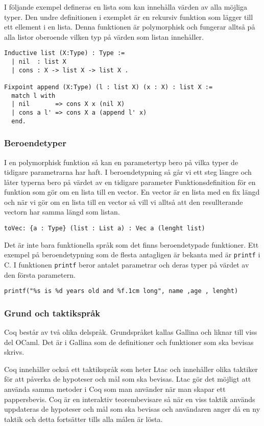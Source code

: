 I följande exempel defineras en lista som kan innehålla värden av alla möjliga
typer. Den undre definitionen i exemplet är en rekursiv funktion som lägger till
ett ellement i en lista. Denna funktionen är polymorphisk och fungerar alltså på
alla listor oberoende vilken typ på värden som listan innehåller.
\begin{verbatim}
Inductive list (X:Type) : Type :=
  | nil  : list X
  | cons : X -> list X -> list X .

Fixpoint append (X:Type) (l : list X) (x : X) : list X :=
  match l with
  | nil       => cons X x (nil X)
  | cons a l' => cons X a (append l' x)
  end.
\end{verbatim}

\subsubsection{Beroendetyper}
I en polymorphisk funktion så kan en parametertyp bero på vilka typer de
tidigare parametrarna har haft. I beroendetypning så går vi ett steg längre och
låter typerna bero på värdet av en tidigare parameter
Funktionsdefinition för en funktion som gör om en lista till en vector. En
vector är en lista med en fix längd och när vi gör om en lista till en vector
så vill vi alltså att den resullterande vectorn har samma längd som listan.
\begin{verbatim}
toVec: {a : Type} (list : List a) : Vec a (lenght list)
\end{verbatim}

Det är inte bara funktionella språk som det finns beroendetypade funktioner.
Ett exempel på beroendetypning som de flesta antagligen är bekanta med är
\texttt{printf} i C. I funktionen \texttt{printf} beror antalet parametrar och
deras typer på värdet av den första parametern.

\begin{verbatim}
printf("%s is %d years old and %f.1cm long", name ,age , lenght)
\end{verbatim}

\begin{comment}
CoqArt
http://mattam.org/research/publications/Programming_with_Dependent_Types_in_Coq-PPS-260209.pdf
** DONE Grund och taktikspråk
   CLOSED: [2013-05-10 fre 10:41]
\end{comment}

\subsubsection{Grund och taktikspråk}
Coq består av två olika delspråk. Grundspråket kallas Gallina och liknar till
viss del OCaml. Det är i Gallina som de definitioner och funktioner som ska
bevisas skrivs.

Coq innehåller också ett taktikspråk som heter Ltac och innehåller olika
taktiker för att påverka de hypoteser och mål som ska bevisas. Ltac gör det
möjligt att använda samma metoder i Coq som man använder när man skapar ett
pappersbevis.
Coq är en interaktiv teorembevisare så när en viss taktik används uppdateras de
hypoteser och mål som ska bevisas och användaren anger då en ny taktik och
detta fortsätter tills alla målen är lösta.
